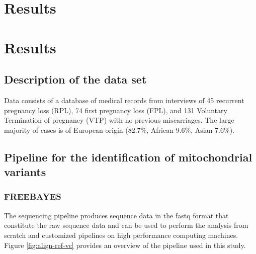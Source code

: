 \chapter{Results} %
\label{Chapter3} %
\newcommand{\keyword}[1]{\textbf{#1}}
\newcommand{\tabhead}[1]{\textbf{#1}}
\newcommand{\code}[1]{\texttt{#1}}
\newcommand{\file}[1]{\texttt{\bfseries#1}}
\newcommand{\option}[1]{\texttt{\itshape#1}}


\chapter{Results}
\section{Description of the data set}
Data consists of a database of medical records from interviews of 45 recurrent pregnancy loss (RPL), 74 first pregnancy loss (FPL), and 131 Voluntary Termination of pregnancy (VTP) with no previous miscarriages. The large majority of cases is of European origin (82.7\%, African 9.6\%, Asian 7.6\%).\newline



\section{Pipeline for the identification of mitochondrial variants}
\subsection{FREEBAYES}
The sequencing pipeline produces sequence data in the \gls{fastq} format that constitute the raw sequence data and can be used to perform the analysis from scratch and customized pipelines on \gls{high performance computing} machines. Figure \ref{fig:align-ref-vc} provides an overview of the pipeline used in this study.\newline

